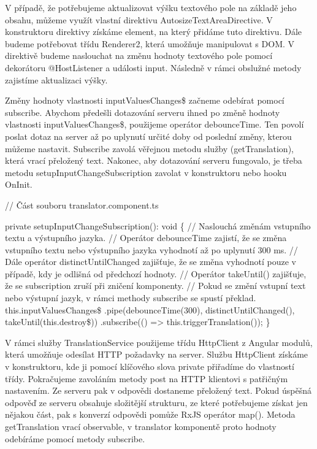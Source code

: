 V případě, že potřebujeme aktualizovat výšku textového pole na základě jeho obsahu, můžeme využít vlastní direktivu AutosizeTextAreaDirective. 
V konstruktoru direktivy získáme element, na který přidáme tuto direktivu. Dále budeme potřebovat třídu Renderer2, která umožňuje manipulovat s DOM. 
V direktivě budeme naslouchat na změnu hodnoty textového pole pomocí dekorátoru @HostListener a události input. Následně v rámci obslužné metody zajistíme aktualizaci výšky.

Změny hodnoty vlastnosti inputValuesChanges\$ začneme odebírat pomocí subscribe. 
Abychom předešli dotazování serveru ihned po změně hodnoty vlastnosti inputValuesChanges\$, použijeme operátor debounceTime. 
Ten povolí poslat dotaz na server až po uplynutí určité doby od poslední změny, kterou můžeme nastavit. 
Subscribe zavolá věřejnou metodu služby (getTranslation), která vrací přeložený text. 
Nakonec, aby dotazování serveru fungovalo, je třeba metodu setupInputChangeSubscription zavolat v konstruktoru nebo hooku OnInit.

\begin{prog}
// Část souboru translator.component.ts

private setupInputChangeSubscription(): void \{
  // Naslouchá změnám vstupního textu a výstupního jazyka.
  // Operátor debounceTime zajistí, že se změna vstupního textu 
    nebo výstupního jazyka vyhodnotí až po uplynutí 300 ms.
  // Dále operátor distinctUntilChanged zajišťuje, 
    že se změna vyhodnotí pouze v případě, kdy je odlišná od předchozí hodnoty.
  // Operátor takeUntil() zajišťuje, 
    že se subscription zruší při zničení komponenty.
  // Pokud se změní vstupní text nebo výstupní jazyk, 
    v rámci methody subscribe se spustí překlad.
  this.inputValuesChanges\$
    .pipe(debounceTime(300), distinctUntilChanged(), takeUntil(this.destroy\$))
    .subscribe(() => this.triggerTranslation());
\}
\end{prog}

V rámci služby TranslationService použijeme třídu HttpClient z Angular modulů, která umožňuje odesílat HTTP požadavky na server.
Službu HttpClient získáme v konstruktoru, kde ji pomocí klíčového slova private přiřadíme do vlastností třídy. 
Pokračujeme zavoláním metody post na HTTP klientovi s patřičným nastavením. Ze serveru pak v odpovědi dostaneme přeložený text. 
Pokud úspěšná odpověď ze serveru obsahuje složitější strukturu, ze které potřebujeme získat jen nějakou část, pak s konverzí odpovědi pomůže RxJS operátor map(). 
Metoda getTranslation vrací observable, v translator komponentě proto hodnoty odebíráme pomocí metody subscribe.

